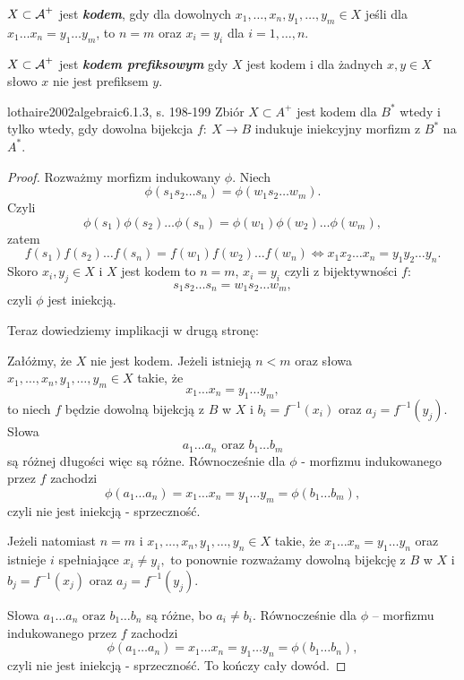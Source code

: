 \begin{definition}{}{}
  $X \subset \operatorname{\mathcal{A}}^+$ jest \textbf{\textit{kodem}}, gdy dla dowolnych $x_1, \ldots, x_n, y_1, \ldots, y_m \in X$ jeśli dla $x_1 \ldots x_n = y_1 \ldots y_m$, to $n = m$ oraz $x_i = y_i$ dla $i = 1, \ldots, n$.
\end{definition}

\begin{definition}{}{}
  $X \subset \operatorname{\mathcal{A}}^+$ jest \textbf{\textit{kodem prefiksowym}} gdy $X$ jest kodem i dla żadnych $x, y \in X$ słowo $x$ nie jest prefiksem $y$.
\end{definition}

\begin{problem}{lothaire2002algebraic}{6.1.3, s. 198-199}
  Zbiór $X \subset A^{+}$ jest kodem dla $B^{*}$ wtedy i tylko wtedy, gdy dowolna bijekcja $f:\ X \rightarrow B$ indukuje iniekcyjny morfizm z $B^{*}$ na $A^{*}$.
\end{problem}

\begin{proof}
Rozważmy morfizm indukowany $\phi$. Niech
$$\phi(s_1s_2\dots s_n) = \phi(w_1s_2\dots w_m).$$ 
Czyli
$$\phi(s_1)\phi(s_2)\dots \phi(s_n) = \phi(w_1)\phi(w_2)\dots \phi(w_m),$$
zatem
$$f(s_1)f(s_2)\dots f(s_n) =  f(w_1)f(w_2)\dots f(w_n) \Leftrightarrow x_1 x_2\dots x_n = y_1 y_2 \dots y_n.$$
Skoro $x_i, y_j \in X$ i $X$ jest kodem to $n = m$, $x_i = y_i$ czyli z bijektywności $f$:
$$s_1s_2\dots s_n = w_1s_2\dots w_m,$$
czyli $\phi$ jest iniekcją.

Teraz dowiedziemy implikacji w drugą stronę:

Załóżmy, że $X$ nie jest kodem. Jeżeli istnieją $n < m$ oraz słowa $x_1, \dots, x_n, y_1, \dots, y_m \in X$ takie, że 
$$x_1 \dots x_n = y_1 \dots y_m,$$ 
to niech $f$ będzie dowolną bijekcją z $B$ w $X$ i $b_i = f^{-1}(x_i)$ oraz $a_j = f^{-1}(y_j)$. Słowa
$$a_1 \dots a_n \text{ oraz } b_1 \dots b_m$$
są różnej długości więc są różne. Równocześnie dla $\phi$ - morfizmu indukowanego przez $f$ zachodzi
$$\phi(a_1 \dots a_n) = x_1 \dots x_n = y_1 \dots y_m = \phi(b_1 \dots b_m),$$
czyli nie jest iniekcją - sprzeczność.

Jeżeli natomiast $n=m$ i $x_1, \dots, x_n, y_1, \dots, y_n \in X$ takie, że
$x_1 \dots x_n = y_1 \dots y_n$
oraz istnieje $i$ spełniające 
$x_i \neq y_i,$
to ponownie rozważamy dowolną bijekcję z $B$ w $X$ i $b_j = f^{-1}(x_j)$ oraz $a_j = f^{-1}(y_j)$.

Słowa
$a_1 \dots a_n \text{ oraz } b_1 \dots b_n$
są różne, bo $a_i \neq b_i$. Równocześnie dla $\phi$ -- morfizmu indukowanego przez $f$ zachodzi
$$\phi(a_1 \dots a_n) = x_1 \dots x_n = y_1 \dots y_n = \phi(b_1 \dots b_n),$$
czyli nie jest iniekcją - sprzeczność.
To kończy cały dowód.
\end{proof}
